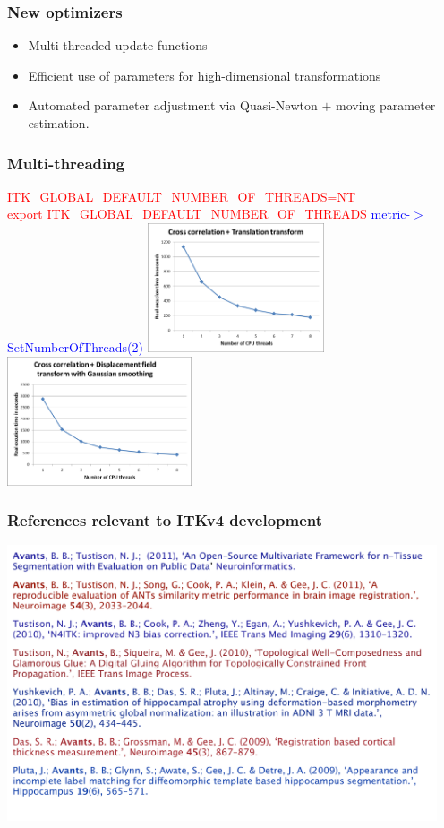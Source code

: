 \begin{frame}
\frametitle{New optimizers}
\Large
\begin{itemize}
\item Multi-threaded update functions
\item Efficient use of parameters for high-dimensional transformations
\item Automated parameter adjustment via Quasi-Newton $+$ moving parameter estimation.
\end{itemize}
\end{frame}

\begin{frame}
\Large
\frametitle{Multi-threading}
\textcolor{red}{ ITK\_GLOBAL\_DEFAULT\_NUMBER\_OF\_THREADS=NT}\\
\textcolor{red}{export ITK\_GLOBAL\_DEFAULT\_NUMBER\_OF\_THREADS}
\vskip20pt
\textcolor{blue}{metric-$>$SetNumberOfThreads(2)}
\includegraphics[height=1.5in]{../Art/cctran}~~\includegraphics[height=1.5in]{../Art/ccfield}
\end{frame}

\begin{frame}
\Large
\frametitle{References relevant to ITKv4 development}
\includegraphics[height=3.2in]{../Art/registration_references}
\end{frame}

